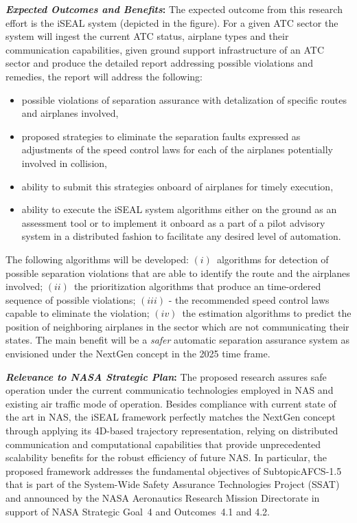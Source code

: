 \documentclass[letter,onecolumn,12pt]{aiaa-tc}
\begin{document}
\medskip

\textbf{\emph{Expected Outcomes and Benefits}:} The expected outcome from this research effort is the iSEAL system (depicted in the figure). For a given ATC sector the system will ingest the current ATC status, airplane types and their communication capabilities, given ground support infrastructure of an ATC sector and produce the detailed report addressing possible violations and remedies, the report will address the following:
\begin{itemize}
    \item possible violations of separation assurance with detalization of specific routes and airplanes involved,
    \item proposed strategies to eliminate the separation faults expressed as adjustments of the speed control laws for each of the airplanes potentially involved in collision,
    \item ability to submit this strategies onboard of airplanes for timely execution,
    \item ability to execute the iSEAL system algorithms either on the ground as an assessment tool or to implement it onboard as a part of a pilot advisory system in a distributed fashion to facilitate any desired level of automation.
\end {itemize}
        
The following algorithms will be developed: $(i)$~algorithms for detection of possible separation violations that are able to identify the route and the airplanes involved; $(ii)$~the prioritization algorithms that produce an time-ordered sequence of possible violations; $(iii)$ - the recommended speed control laws capable to eliminate the violation; $(iv)$~the estimation algorithms to predict the position of neighboring airplanes in the sector which are not communicating their states. The main benefit will be a \emph{safer} automatic separation assurance system as envisioned under the NextGen concept in the 2025 time frame.

\medskip

\textbf{\emph{Relevance to NASA Strategic Plan}:} The proposed research assures safe operation under the current communicatio technologies employed in NAS and existing air traffic mode of operation. Besides compliance with current state of the art in NAS, the iSEAL framework perfectly matches the NextGen concept through applying its 4D-based trajectory representation, relying on distributed communication and computational capabilities that provide unprecedented scalability benefits for the robust efficiency of future NAS. 
In particular, the proposed framework addresses the fundamental objectives of Subtopic\mbox{AFCS-1.5} that is part of the System-Wide Safety Assurance Technologies Project (SSAT) and announced by the NASA Aeronautics Research Mission Directorate in support of NASA Strategic Goal~4 and Outcomes~4.1 and 4.2.
\end{document}
